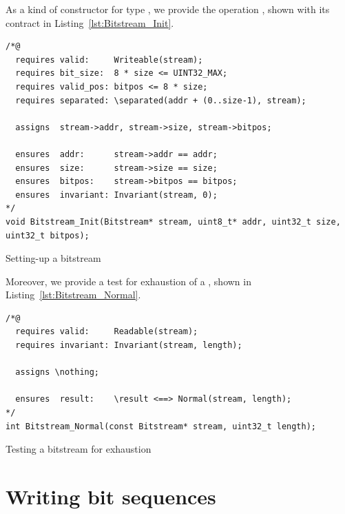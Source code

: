 As a kind of constructor for type
, we provide the operation ,
shown with its contract in Listing~\ref{lst:Bitstream_Init}.




\begin{listing}[hbt]
\begin{minipage}{0.99\textwidth}
\begin{lstlisting}[style=acsl-block]
/*@
  requires valid:     Writeable(stream);
  requires bit_size:  8 * size <= UINT32_MAX;
  requires valid_pos: bitpos <= 8 * size;
  requires separated: \separated(addr + (0..size-1), stream);

  assigns  stream->addr, stream->size, stream->bitpos;

  ensures  addr:      stream->addr == addr;
  ensures  size:      stream->size == size;
  ensures  bitpos:    stream->bitpos == bitpos;
  ensures  invariant: Invariant(stream, 0);
*/
void Bitstream_Init(Bitstream* stream, uint8_t* addr, uint32_t size, uint32_t bitpos);
\end{lstlisting}
\end{minipage}
\caption{\label{lst:Bitstream_Init}Setting-up a bitstream}
\end{listing}

\FloatBarrier

Moreover, we provide a test for exhaustion of a ,
shown in Listing~\ref{lst:Bitstream_Normal}.


\begin{listing}[hbt]
\begin{minipage}{0.99\textwidth}
\begin{lstlisting}[style=acsl-block]
/*@
  requires valid:     Readable(stream);
  requires invariant: Invariant(stream, length);

  assigns \nothing;

  ensures  result:    \result <==> Normal(stream, length);
*/
int Bitstream_Normal(const Bitstream* stream, uint32_t length);
\end{lstlisting}
\end{minipage}
\caption{\label{lst:Bitstream_Normal}Testing a bitstream for exhaustion}
\end{listing}



\clearpage


\section{Writing bit sequences}
\label{sec:writing bit sequences}


